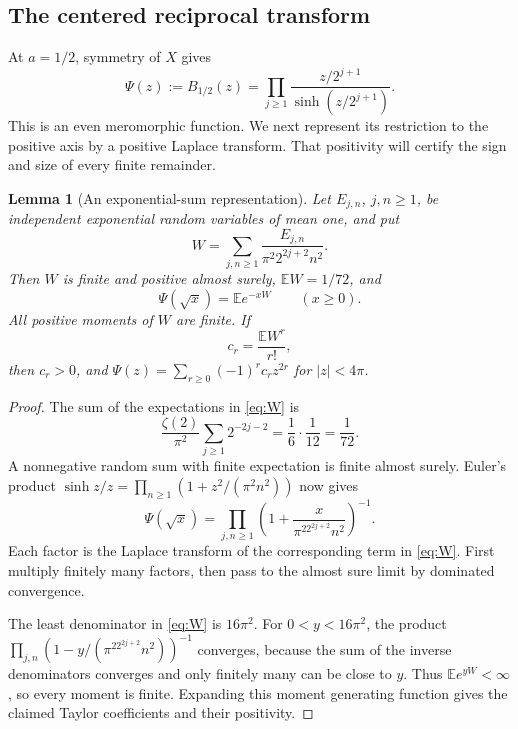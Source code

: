 \documentclass[11pt,a4paper]{article}
\numberwithin{equation}{section}
\newtheorem{lemma}[lemma]{Lemma}
\theoremstyle{definition}
\theoremstyle{remark}
\newcommand{\E}{\mathbb E}
\newcommand{\abs}[1]{\left|#1\right|}
\begin{document}
\subsection{The centered reciprocal transform}
At $a=1/2$, symmetry of $X$ gives
\begin{equation}
 \Psi(z):=B_{1/2}(z)
 =\prod_{j\ge1}\frac{z/2^{j+1}}{\sinh(z/2^{j+1})}.
 \label{eq:Psi}
\end{equation}
This is an even meromorphic function. We next represent its
restriction to the positive axis by a positive Laplace transform.
That positivity will certify the sign and size of every finite
remainder.

\begin{lemma}[An exponential-sum representation]
\label{lem:W}
Let $E_{j,n}$, $j,n\ge1$, be independent exponential random variables
of mean one, and put
\begin{equation}
 W=\sum_{j,n\ge1}\frac{E_{j,n}}{\pi^2 2^{2j+2}n^2}.
 \label{eq:W}
\end{equation}
Then $W$ is finite and positive almost surely,
$\E W=1/72$, and
\begin{equation}
 \boxed{\Psi(\sqrt{x})=\E e^{-xW}\qquad(x\ge0).}
 \label{eq:Psi-Laplace}
\end{equation}
All positive moments of $W$ are finite. If
\begin{equation}
 c_r=\frac{\E W^r}{r!},
 \label{eq:c-def}
\end{equation}
then $c_r>0$, and
$\Psi(z)=\sum_{r\ge0}(-1)^rc_rz^{2r}$ for $\abs z<4\pi$.
\end{lemma}
\begin{proof}
The sum of the expectations in \cref{eq:W} is
\[
 \frac{\zeta(2)}{\pi^2}\sum_{j\ge1}2^{-2j-2}
 =\frac16\cdot\frac1{12}=\frac1{72}.
\]
A nonnegative random sum with finite expectation is finite almost
surely. Euler's product
$\sinh z/z=\prod_{n\ge1}(1+z^2/(\pi^2n^2))$ now gives
\[
 \Psi(\sqrt{x})
 =\prod_{j,n\ge1}\left(1+\frac{x}{\pi^22^{2j+2}n^2}\right)^{-1}.
\]
Each factor is the Laplace transform of the corresponding term in
\cref{eq:W}. First multiply finitely many factors, then pass to the
almost sure limit by dominated convergence.

The least denominator in \cref{eq:W} is $16\pi^2$.
For $0<y<16\pi^2$, the product
$\prod_{j,n}(1-y/(\pi^22^{2j+2}n^2))^{-1}$ converges, because the
sum of the inverse denominators converges and only finitely many
can be close to $y$. Thus $\E e^{yW}<\infty$, so every moment is
finite. Expanding this moment generating function gives the claimed
Taylor coefficients and their positivity.
\end{proof}
\end{document}
